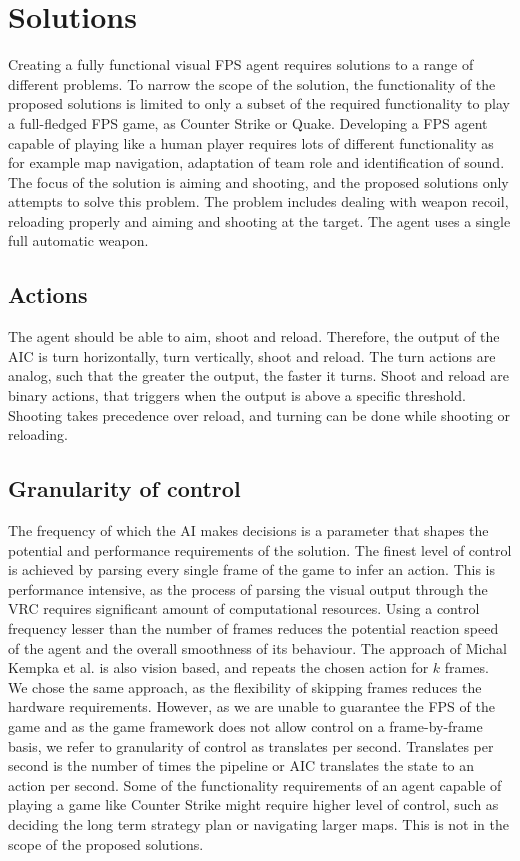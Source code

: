
\section{Solutions}
\label{sec:solutions}
Creating a fully functional visual FPS agent requires solutions to a range of different problems. To narrow the scope of the solution, the functionality of the proposed solutions is limited to only a subset of the required functionality to play a full-fledged FPS game, as Counter Strike or Quake. Developing a FPS agent capable of playing like a human player requires lots of different functionality as for example map navigation, adaptation of team role and identification of sound. The focus of the solution is aiming and shooting, and the proposed solutions only attempts to solve this problem. The problem includes dealing with weapon recoil, reloading properly and aiming and shooting at the target. The agent uses a single full automatic weapon.

\subsection{Actions}
The agent should be able to aim, shoot and reload. Therefore, the output of the AIC is turn horizontally, turn vertically, shoot and reload. The turn actions are analog, such that the greater the output, the faster it turns. Shoot and reload are binary actions, that triggers when the output is above a specific threshold. Shooting takes precedence over reload, and turning can be done while shooting or reloading.

\subsection{Granularity of control}
The frequency of which the AI makes decisions is a parameter that shapes the potential and performance requirements of the solution. The finest level of control is achieved by parsing every single frame of the game to infer an action. This is performance intensive, as the process of parsing the visual output through the VRC requires significant amount of computational resources. Using a control frequency lesser than the number of frames reduces the potential reaction speed of the agent and the overall smoothness of its behaviour. The approach of Michal Kempka et al.\cite{vizdoom} is also vision based, and repeats the chosen action for $k$ frames. We chose the same approach, as the flexibility of skipping frames reduces the hardware requirements. However, as we are unable to guarantee the FPS of the game and as the game framework does not allow control on a frame-by-frame basis, we refer to granularity of control as translates per second. Translates per second is the number of times the pipeline or AIC translates the state to an action per second.
Some of the functionality requirements of an agent capable of playing a game like Counter Strike might require higher level of control, such as deciding the long term strategy plan or navigating larger maps. This is not in the scope of the proposed solutions.

